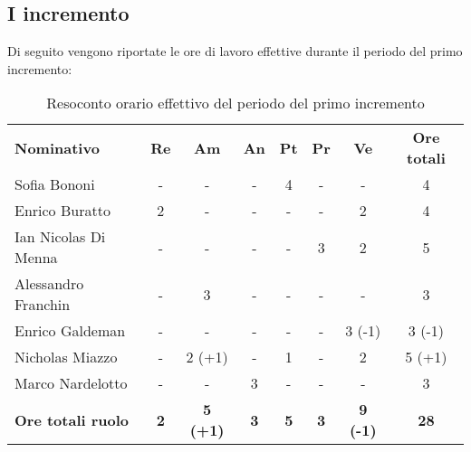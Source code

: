 \documentclass[../piano-di-progetto.tex]{subfiles}
\begin{document}
\subsection{I incremento}

Di seguito vengono riportate le ore di lavoro effettive durante il periodo del primo incremento:
\begin{table}[H]
    \centering
    \begin{tabular}{lccccccc}
      \rowcolor{lightgray}
      \textbf{Nominativo}       & \textbf{Re}      & \textbf{Am} & \textbf{An}      & \textbf{Pt} & \textbf{Pr} & \textbf{Ve} & \textbf{Ore totali} \\
Sofia Bononi              & -          & -               & -          & 4          & -          & -               & 4           \\
Enrico Buratto            & 2          & -               & -          & -          & -          & 2               & 4           \\
Ian Nicolas Di Menna      & -          & -               & -          & -          & 3          & 2               & 5           \\
Alessandro Franchin       & -          & 3               & -          & -          & -          & -               & 3           \\
Enrico Galdeman           & -          & -               & -          & -          & -          & 3 (-1)          & 3 (-1)      \\
Nicholas Miazzo           & -          & 2 (+1)          & -          & 1          & -          & 2               & 5 (+1)      \\
Marco Nardelotto          & -          & -               & 3          & -          & -          & -               & 3           \\
\textbf{Ore totali ruolo} & \textbf{2} & \textbf{5 (+1)} & \textbf{3} & \textbf{5} & \textbf{3} & \textbf{9 (-1)} & \textbf{28}
    \end{tabular}
    \caption{Resoconto orario effettivo del periodo del primo incremento}
  \end{table}
\end{document}
